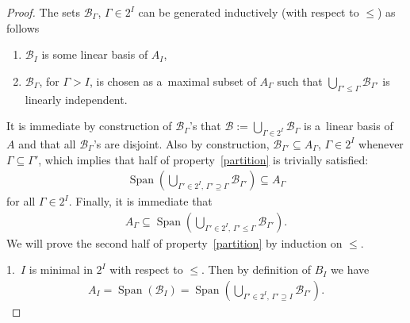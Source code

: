 \documentclass[pdftex]{sigma}
\DeclareMathOperator{\Span}{Span}
\begin{document}
\begin{proof}
The sets $\mathcal{B}_\Gamma$, $\Gamma\in2^I$ can be generated inductively (with respect to $\leq$) as follows
\begin{enumerate}\itemsep=0pt
\item[1)] $\mathcal{B}_I$ is some linear basis of $A_I$,
\item[2)] $\mathcal{B}_\Gamma$, for $\Gamma>I$, is chosen as a~maximal subset of $A_\Gamma$ such that
$\bigcup_{\Gamma'\leq\Gamma}\mathcal{B}_{\Gamma'}$ is linearly independent.
\end{enumerate}
It is immediate by construction of $\mathcal{B}_\Gamma$'s that $\mathcal{B}:=\bigcup_{\Gamma\in2^I}\mathcal{B}_\Gamma$
is a~linear basis of~$A$ and that all $\mathcal{B}_\Gamma$'s are disjoint.
Also by construction, $\mathcal{B}_{\Gamma'}\subseteq A_\Gamma$, $\Gamma\in2^I$ whenever $\Gamma\subseteq \Gamma'$,
which implies that half of property~\eqref{partition} is trivially satisf\/ied:
\begin{gather*}
\Span\left(\bigcup_{\Gamma'\in2^I,\, \Gamma'\supseteq\Gamma}\mathcal{B}_{\Gamma'}\right)\subseteq A_\Gamma
\end{gather*}
for all $\Gamma\in2^I$.
Finally, it is immediate that
\begin{gather}
\label{partition0}
A_\Gamma\subseteq\Span\left(\bigcup_{\Gamma'\in2^I,\, \Gamma'\leq\Gamma}\mathcal{B}_{\Gamma'}\right).
\end{gather}
We will prove the second half of property~\eqref{partition} by induction on $\leq$.

1.~$I$ is minimal in $2^I$ with respect to $\leq$.
Then by def\/inition of $B_I$ we have
\begin{gather*}
A_I= \Span(\mathcal{B}_I) = \Span\left(\bigcup_{\Gamma'\in2^I,\, \Gamma'\supseteq I}\mathcal{B}_{\Gamma'}\right).
\end{gather*}


\end{proof}
\end{document}
